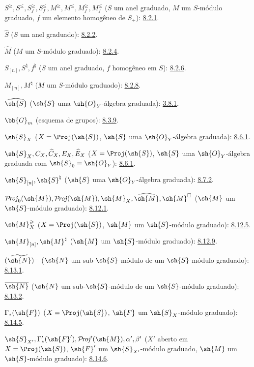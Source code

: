 \documentclass[oneside,10pt]{amsart}
\renewcommand{\leq}{\leqslant}
\renewcommand{\geq}{\geqslant}
\def\shProj{\mathcal{P}\!\mathit{roj}}
\begin{document}
$S^\geq,S^\leq,S_f^\geq,S_f^\leq,
M^\geq,M^\leq,M_f^\geq,M_f^\leq$
($S$ um anel graduado, $M$ um $S$-módulo graduado,
$f$ um elemento homogêneo de $S_+$): \hyperref[II.8.2.1]{8.2.1}.

$\widehat S$ ($S$ um anel graduado): \hyperref[II.8.2.2]{8.2.2}.

$\widehat M$ ($M$ um $S$-módulo graduado): \hyperref[II.8.2.4]{8.2.4}.

$S_{[n]},S^\natural,f^\natural$
($S$ um anel graduado, $f$ homogêneo em $S$): \hyperref[II.8.2.6]{8.2.6}.

$M_{[n]},M^\natural$ ($M$ um $S$-módulo graduado): \hyperref[II.8.2.8]{8.2.8}.

$\widehat{\sh{S}}$ ($\sh{S}$ uma $\sh{O}_Y$-álgebra graduada): \hyperref[II.8.3.1]{3.8.1}.

$\bb{G}_m$ (esquema de grupos): \hyperref[II.8.3.9]{8.3.9}.

$\sh{S}_X$ ($X=\Proj(\sh{S})$, $\sh{S}$ uma $\sh{O}_Y$-álgebra graduada): \hyperref[II.8.6.1]{8.6.1}.

$\sh{S}_X,C_X,\widehat C_X,E_X,\widehat E_X$
($X=\Proj(\sh{S})$, $\sh{S}$ uma $\sh{O}_Y$-álgebra graduada
com $\sh{S}_0=\sh{O}_Y$): \hyperref[II.8.6.1]{8.6.1}.

$\sh{S}_{[n]},\sh{S}^{\natural}$
($\sh{S}$ uma $\sh{O}_Y$-álgebra graduada): \hyperref[II.8.7.2]{8.7.2}.

$\shProj_0(\sh{M}),\shProj(\sh{M}),\sh{M}_X,
\widehat{\sh{M}},\sh{M}^{\square}$
($\sh{M}$ um $\sh{S}$-módulo graduado): \hyperref[II.8.12.1]{8.12.1}.

$\sh{M}_X^\geq$
($X=\Proj(\sh{S})$, $\sh{M}$ um $\sh{S}$-módulo graduado): \hyperref[II.8.12.5]{8.12.5}.

$\sh{M}_{[n]},\sh{M}^{\natural}$
($\sh{M}$ um $\sh{S}$-módulo graduado): \hyperref[II.8.12.9]{8.12.9}.

$(\widetilde{\sh{N}})^-$
($\sh{N}$ um sub-$\sh{S}$-módulo de um $\sh{S}$-módulo graduado): \hyperref[II.8.13.1]{8.13.1}.

$\overline{\sh{N}}$
($\sh{N}$ um sub-$\sh{S}$-módulo de um $\sh{S}$-módulo graduado): \hyperref[II.8.13.2]{8.13.2}.

$\Gamma_*(\sh{F})$
($X=\Proj(\sh{S})$, $\sh{F}$ um $\sh{S}_X$-módulo graduado): \hyperref[II.8.14.5]{8.14.5}.

$\sh{S}_{X'},\Gamma'_*(\sh{F}'),\shProj'(\sh{M}),
\alpha',\beta'$
($X'$ aberto em $X=\Proj(\sh{S})$, $\sh{F}'$ um $\sh{S}_{X'}$-módulo graduado,
$\sh{M}$ um $\sh{S}$-módulo graduado): \hyperref[II.8.14.6]{8.14.6}.
\end{document}
